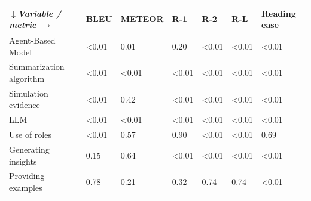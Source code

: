\begin{tabular}{|l|l|l|l|l|l|l|}
\hline
\textit{$\downarrow$Variable / metric $\rightarrow$} & BLEU & METEOR & R-1 & R-2 & R-L & Reading ease \\
 \hline
 Agent-Based Model & \textless{}0.01 & 0.01 & 0.20 & \textless{}0.01 & \textless{}0.01 & \textless{}0.01 \\
 \hline
 Summarization algorithm & \textless{}0.01 & \textless{}0.01 & \textless{}0.01 & \textless{}0.01 & \textless{}0.01 & \textless{}0.01 \\
 \hline
 Simulation evidence & \textless{}0.01 & 0.42 & \textless{}0.01 & \textless{}0.01 & \textless{}0.01 & \textless{}0.01 \\
 \hline
 LLM & \textless{}0.01 & \textless{}0.01 & \textless{}0.01 & \textless{}0.01 & \textless{}0.01 & \textless{}0.01 \\
 \hline
 Use of roles & \textless{}0.01 & 0.57 & 0.90 & \textless{}0.01 & \textless{}0.01 & 0.69 \\
 \hline
 Generating insights & 0.15 & 0.64 & \textless{}0.01 & \textless{}0.01 & \textless{}0.01 & \textless{}0.01 \\
 \hline
 Providing examples & 0.78 & 0.21 & 0.32 & 0.74 & 0.74 & \textless{}0.01 \\
\hline
\end{tabular}
